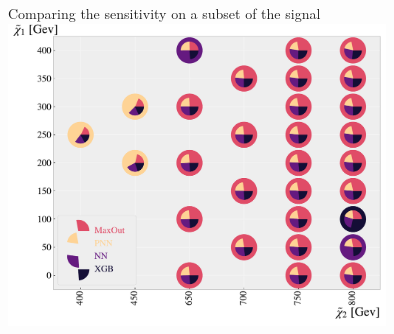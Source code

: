 \documentclass[UKenglish]{beamer}
\begin{document}

\begin{frame}{Comparing the sensitivity on a subset of the signal}
    \vfill
    \centering
    \includegraphics[width=0.75\textwidth]{figures/Comps/GenPlussXGBNetworkComp.pdf}
\end{frame}
\end{document}
